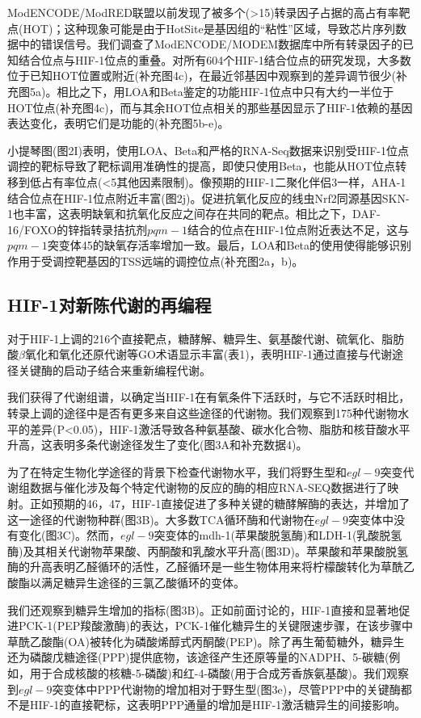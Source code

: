 \documentclass{ctexart}
\begin{document}
        ModENCODE/ModRED联盟以前发现了被多个(>15)转录因子占据的高占有率靶点(HOT)；这种现象可能是由于HotSite是基因组的“粘性”区域，导致芯片序列数据中的错误信号。我们调查了ModENCODE/MODEM数据库中所有转录因子的已知结合位点与HIF-1位点的重叠。对所有604个HIF-1结合位点的研究发现，大多数位于已知HOT位置或附近(补充图4c)，在最近邻基因中观察到的差异调节很少(补充图5a)。相比之下，用LOA和Beta鉴定的功能HIF-1位点中只有大约一半位于HOT位点(补充图4c)，而与其余HOT位点相关的那些基因显示了HIF-1依赖的基因表达变化，表明它们是功能的(补充图5b-e)。

        小提琴图(图2I)表明，使用LOA、Beta和严格的RNA-Seq数据来识别受HIF-1位点调控的靶标导致了靶标调用准确性的提高，即使只使用Beta，也能从HOT位点转移到低占有率位点(<5其他因素限制)。像预期的HIF-1二聚化伴侣3一样，AHA-1结合位点在HIF-1位点附近丰富(图2j)。促进抗氧化反应的线虫Nrf2同源基因SKN-1也丰富，这表明缺氧和抗氧化反应之间存在共同的靶点。相比之下，DAF-16/FOXO的锌指转录拮抗剂$pqm-1$结合的位点在HIF-1位点附近表达不足，这与$pqm-1$突变体45的缺氧存活率增加一致。最后，LOA和Beta的使用使得能够识别作用于受调控靶基因的TSS远端的调控位点(补充图2a，b)。

    \subsection{HIF-1对新陈代谢的再编程}

        对于HIF-1上调的216个直接靶点，糖酵解、糖异生、氨基酸代谢、硫氧化、脂肪酸$\beta$氧化和氧化还原代谢等GO术语显示丰富(表1)，表明HIF-1通过直接与代谢途径关键酶的启动子结合来重新编程代谢。

        我们获得了代谢组谱，以确定当HIF-1在有氧条件下活跃时，与它不活跃时相比，转录上调的途径中是否有更多来自这些途径的代谢物。我们观察到175种代谢物水平的差异(P<0.05)，HIF-1激活导致各种氨基酸、碳水化合物、脂肪和核苷酸水平升高，这表明多条代谢途径发生了变化(图3A和补充数据4)。

        为了在特定生物化学途径的背景下检查代谢物水平，我们将野生型和$egl-9$突变代谢组数据与催化涉及每个特定代谢物的反应的酶的相应RNA-SEQ数据进行了映射。正如预期的46，47，HIF-1直接促进了多种关键的糖酵解酶的表达，并增加了这一途径的代谢物种群(图3B)。大多数TCA循环酶和代谢物在$egl-9$突变体中没有变化(图3C)。然而，$egl-9$突变体的mdh-1(苹果酸脱氢酶)和LDH-1(乳酸脱氢酶)及其相关代谢物苹果酸、丙酮酸和乳酸水平升高(图3D)。苹果酸和苹果酸脱氢酶的升高表明乙醛循环的活性，乙醛循环是一些生物体用来将柠檬酸转化为草酰乙酸酯以满足糖异生途径的三氯乙酸循环的变体。

        我们还观察到糖异生增加的指标(图3B)。正如前面讨论的，HIF-1直接和显著地促进PCK-1(PEP羧酸激酶)的表达，PCK-1催化糖异生的关键限速步骤，在该步骤中草酰乙酸酯(OA)被转化为磷酸烯醇式丙酮酸(PEP)。除了再生葡萄糖外，糖异生还为磷酸戊糖途径(PPP)提供底物，该途径产生还原等量的NADPH、5-碳糖(例如，用于合成核酸的核糖-5-磷酸)和红-4-磷酸(用于合成芳香族氨基酸)。我们观察到$egl-9$突变体中PPP代谢物的增加相对于野生型(图3e)，尽管PPP中的关键酶都不是HIF-1的直接靶标，这表明PPP通量的增加是HIF-1激活糖异生的间接影响。
\end{document}
